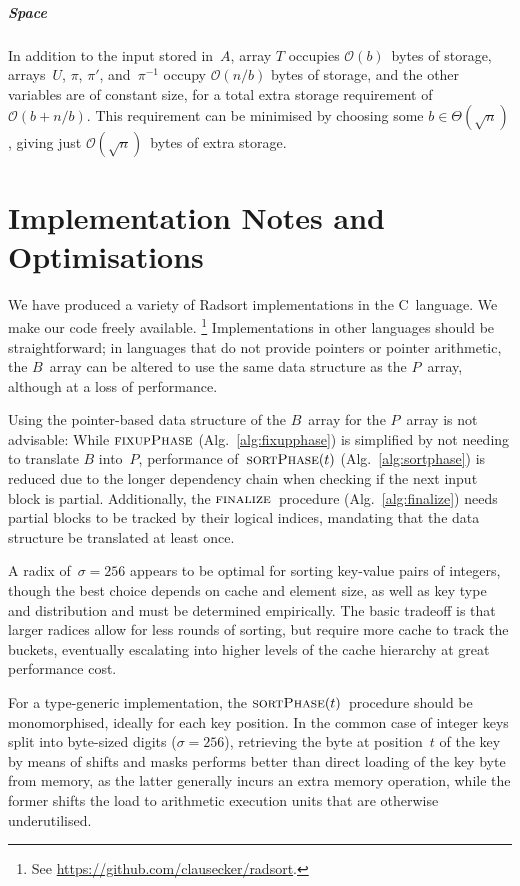 \documentclass[nolineno,a4paper,UKenglish,cleveref, autoref, thm-restate]{socg-lipics-v2021}
\begin{document}
\subparagraph*{Space}
In addition to the input stored in~$A$, array $T$ occupies
$\mathcal O(b)$~bytes of storage, arrays~$U$, $\pi$, $\pi'$, and~$\pi^{-1}$ occupy
$\mathcal O(n/b)$ bytes of storage, and the other variables are of constant size,
for a total extra storage requirement of $\mathcal O(b+n/b)$.  This requirement
can be minimised by choosing some $b\in\Theta(\sqrt n)$,
giving just $\mathcal O(\sqrt n)$~bytes of extra storage.

\section{Implementation Notes and Optimisations} \label{sec:implnotes}
We have produced a variety of Radsort implementations in the
C~language.  We make our code freely available.%
\footnote{See \url{https://github.com/clausecker/radsort}.}
Implementations in other languages should be straightforward; in languages
that do not provide pointers or pointer arithmetic, the $B$~array can be
altered to use the same data structure as the $P$~array, although at a loss
of performance.

Using the pointer-based data structure of the $B$~array for
the $P$~array is not advisable: While $\Call{fixupPhase}{}$ (Alg.~\ref{alg:fixupphase})
is simplified by not needing to translate $B$ into~$P$, performance
of~$\Call{sortPhase}{t}$ (Alg.~\ref{alg:sortphase}) is reduced due
to the longer dependency chain when checking if the next input block
is partial.  Additionally, the $\Call{finalize}{}$~procedure
(Alg.~\ref{alg:finalize}) needs partial blocks to be tracked by their
logical indices, mandating that the data structure be translated at
least once.

A radix of~$\sigma=256$ appears to be optimal for sorting key-value
pairs of integers, though the best choice depends on cache and
element size, as well as key type and distribution and must be
determined empirically.  The basic tradeoff is that larger radices
allow for less rounds of sorting, but require more cache to track the
buckets, eventually escalating into higher levels of the cache hierarchy
at great performance cost.

For a type-generic implementation, the $\Call{sortPhase}{t}$~procedure
should be monomorphised, ideally for each key position.  In the common
case of integer keys split into byte-sized digits ($\sigma=256$),
retrieving the byte at position~$t$ of the key by means of shifts and
masks performs better than direct loading of the key byte from memory,
as the latter generally incurs an extra memory operation, while the
former shifts the load to arithmetic execution units that are otherwise
underutilised.
\end{document}
